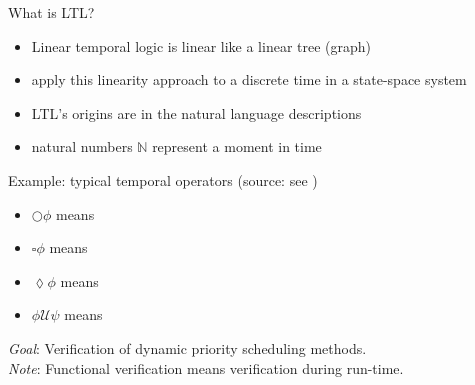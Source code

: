\documentclass{beamer}
\begin{document}
	
		\begin{frame}{What is LTL?}
		\begin{itemize}

			\item Linear temporal logic is linear like a linear tree (graph)
			\item apply this linearity approach to a discrete time in a state-space system 
			\item LTL's origins are in the natural language descriptions
			\item natural numbers $\mathbb{N}$ represent a moment in time
					
		\end{itemize}
		Example: typical temporal operators (source: see \cite{LTL_inCS})
		\begin{itemize}
			\item $\bigcirc \phi$ means  
			\item $\square \phi$ means 
			\item $\lozenge \phi$ means 
			\item $\phi \mathcal{U} \psi$ means 
		\end{itemize}			
			\emph{Goal}: Verification of dynamic priority scheduling methods.\\
			\emph{Note}: Functional verification means verification during run-time. 	 	
		
	\end{frame}
	    
	

		
	

	

%
\end{document}
